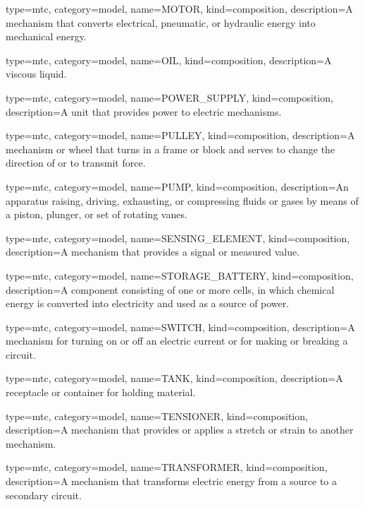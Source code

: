 {
  type=mtc,
  category=model,
  name={MOTOR},
  kind={composition},
  description={A mechanism that converts electrical, pneumatic, or hydraulic energy into mechanical energy.}
}


{
  type=mtc,
  category=model,
  name={OIL},
  kind={composition},
  description={A viscous liquid.}
}


{
  type=mtc,
  category=model,
  name={POWER\_SUPPLY},
  kind={composition},
  description={A unit that provides power to electric mechanisms.}
}


{
  type=mtc,
  category=model,
  name={PULLEY},
  kind={composition},
  description={A mechanism or wheel that turns in a frame or block and serves to change the direction of or to transmit force.}
}


{
  type=mtc,
  category=model,
  name={PUMP},
  kind={composition},
  description={An apparatus raising, driving, exhausting, or compressing fluids or gases by means of a piston, plunger, or set of rotating vanes.}
}


{
  type=mtc,
  category=model,
  name={SENSING\_ELEMENT},
  kind={composition},
  description={A mechanism that provides a signal or measured value.}
}


{
  type=mtc,
  category=model,
  name={STORAGE\_BATTERY},
  kind={composition},
  description={A component consisting of one or more cells, in which chemical energy is converted into electricity and used as a source of power. }
}


{
  type=mtc,
  category=model,
  name={SWITCH},
  kind={composition},
  description={A mechanism for turning on or off an electric current or for making or breaking a circuit.}
}


{
  type=mtc,
  category=model,
  name={TANK},
  kind={composition},
  description={A receptacle or container for holding material.}
}


{
  type=mtc,
  category=model,
  name={TENSIONER},
  kind={composition},
  description={A mechanism that provides or applies a stretch or strain to another mechanism.}
}


{
  type=mtc,
  category=model,
  name={TRANSFORMER},
  kind={composition},
  description={A mechanism that transforms electric energy from a source to a secondary circuit.}
}


